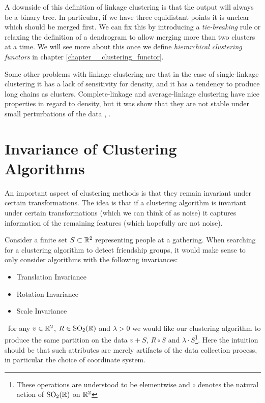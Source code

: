 A downside of this definition of linkage clustering is that the output will always be a binary tree. In particular, if we have three equidistant points it is unclear which should be merged first. We can fix this by introducing a \emph{tie-breaking} rule or relaxing the definition of a dendrogram to allow merging more than two clusters at a time. We will see more about this once 
we define \emph{hierarchical clustering functors} in chapter \ref{chapter__clustering_functor}.

Some other problems with linkage clustering are that in the case of single-linkage clustering it has a lack of sensitivity for density, and it has a tendency to produce long chains as clusters. Complete-linkage and average-linkage clustering have nice properties in regard to density, but it was show that they are not stable under small perturbations of the data \cite[Sec.~3.6]{JMLR:v11:carlsson10a}, \cite{Lance1967-ci}.

\section{Invariance of Clustering Algorithms}
\label{seciton__preserving_structure}
An important aspect of clustering methods is that they remain invariant under certain transformations.
The idea is that if a clustering algorithm is invariant under certain transformations (which we can think of as noise) it captures information of the remaining features (which hopefully are not noise).

\begin{example}{}{}
Consider a finite set $S \subset \mathbb R^2$ representing people at a gathering. When searching for a clustering algorithm to detect friendship groups, it would make sense to only consider algorithms with the following invariances:
\begin{itemize}
    \item Translation Invariance
    \item Rotation Invariance
    \item Scale Invariance
\end{itemize}
\Ie\ for any $v \in \mathbb R^2$, $R \in \mathrm{SO}_2(\mathbb R)$ and $\lambda > 0$ we would like our clustering algorithm to produce the same partition on the data $v + S$, $R \circ S$ and $\lambda \cdot S$\footnote{These operations are understood to be elementwise and $\circ$ denotes the natural action of $\mathrm{SO}_2(\mathbb R)$ on $\mathbb R^2$}. Here the intuition should be that such attributes are merely artifacts of the data collection process, in particular the choice of coordinate system.
\end{example}

